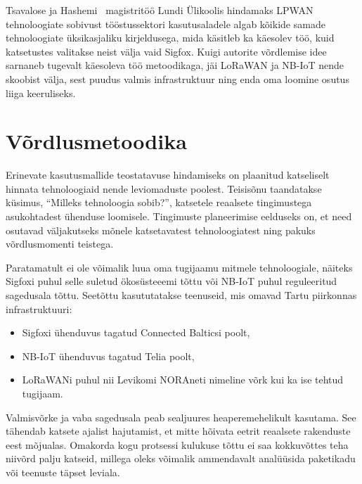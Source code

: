\documentclass[12pt]{article}
\begin{document}

Tsavalose ja Hashemi~\cite{tsavalos2018low} magistritöö Lundi Ülikoolis hindamaks LPWAN tehnoloogiate sobivust tööstussektori kasutusaladele algab kõikide samade tehnoloogiate üksikasjaliku kirjeldusega, mida käsitleb ka käesolev töö, kuid katsetustes valitakse neist välja vaid Sigfox.
Kuigi autorite võrdlemise idee sarnaneb tugevalt käesoleva töö metoodikaga, jäi LoRaWAN ja NB-IoT nende skoobist välja, sest puudus valmis infrastruktuur ning enda oma loomine osutus liiga keeruliseks.

\newpage
\section{Võrdlusmetoodika}

Erinevate kasutusmallide teostatavuse hindamiseks on plaanitud katseliselt hinnata tehnoloogiaid nende leviomaduste poolest.
Teisisõnu taandatakse küsimus, "`Milleks tehnoloogia sobib?"', katsetele reaalsete tingimustega asukohtadest ühenduse loomisele.
Tingimuste planeerimise eelduseks on, et need osutavad väljakutseks mõnele katsetavatest tehnoloogiatest ning pakuks võrdlusmomenti teistega.

Paratamatult ei ole võimalik luua oma tugijaamu mitmele tehnoloogiale, näiteks Sigfoxi puhul selle suletud ökosüsteeemi tõttu või NB-IoT puhul reguleeritud sagedusala tõttu.
Seetõttu kasututatakse teenuseid, mis omavad Tartu piirkonnas infrastruktuuri:
\begin{itemize}
    \item Sigfoxi ühenduvus tagatud Connected Balticsi poolt,
    \item NB-IoT ühenduvus tagatud Telia poolt,
    \item LoRaWANi puhul nii Levikomi NORAneti nimeline võrk kui ka ise tehtud tugijaam.
\end{itemize}
Valmisvõrke ja vaba sagedusala peab sealjuures heaperemehelikult kasutama.
See tähendab katsete ajalist hajutamist, et mitte hõivata eetrit reaalsete rakenduste eest mõjualas.
Omakorda kogu protsessi kulukuse tõttu ei saa kokkuvõttes teha niivõrd palju katseid, millega oleks võimalik ammendavalt analüüsida paketikadu või teenuste täpset leviala.
\end{document}
